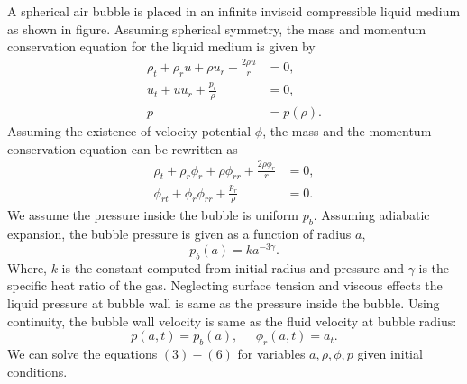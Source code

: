 \documentclass[a4paper]{article}
\begin{document}
A spherical air bubble is placed in an infinite inviscid compressible liquid medium as shown in figure. Assuming spherical symmetry, the mass and momentum conservation equation for the liquid medium is given by
\begin{align}
    \rho_t + \rho_r u + \rho u_r + \frac{2\rho u}{r} & = 0,       \\
    u_t + u u_r + \frac{p_r}{\rho}                   & = 0,       \\
    p                                                & = p(\rho).
\end{align}
Assuming the existence of velocity potential $\phi$, the mass and the momentum conservation equation can be rewritten as
\begin{align}
    \rho_t + \rho_r \phi_r + \rho \phi_{rr} + \frac{2\rho \phi_r}{r} & = 0, \\
    \phi_{rt} + \phi_r \phi_{rr} + \frac{p_r}{\rho}                  & = 0.
\end{align}
We assume the pressure inside the bubble is uniform $p_b$. Assuming adiabatic expansion, the bubble pressure is given as a function of radius $a$,
\begin{equation}
    p_b(a) = k {a}^{-3 \gamma}.
\end{equation}
Where, $k$ is the constant computed from initial radius and pressure and $\gamma$ is the specific heat ratio of the gas. Neglecting surface tension and viscous effects the liquid pressure at bubble wall is same as the pressure inside the bubble. Using continuity, the bubble wall velocity is same as the fluid velocity at bubble radius:
\begin{equation}
    p(a, t) = p_b(a), \;\;\;\;\; \phi_r(a, t) = a_t.
\end{equation}
We can solve the equations $(3) - (6)$ for variables $a, \rho, \phi, p$ given initial conditions.
\end{document}
